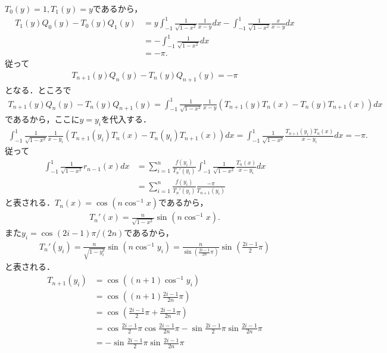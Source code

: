 \documentclass[a4j,papersize,disablejfam,slide,14pt]{jsarticle}
\def\sin#1#2{\operatorname{sin}^{#2} #1} %
\def\cos#1#2{\operatorname{cos}^{#2} #1} %
\begin{document}
    $T_0(y)=1, T_1(y)=y$であるから，
    \begin{align}
    	T_1(y)Q_0(y) - T_0(y)Q_1(y) &= y \int_{-1}^{1} \frac{1}{\sqrt{1-x^2}} \frac{1}{x-y} dx - \int_{-1}^{1} \frac{1}{\sqrt{1-x^2}} \frac{x}{x-y} dx \\
        &= - \int_{-1}^{1} \frac{1}{\sqrt{1-x^2}} dx \\
        &= -\pi.
    \end{align}
    従って
    \begin{align}
    	T_{n+1}(y)Q_n(y) - T_n(y)Q_{n+1}(y) = -\pi
    \end{align}
    となる．ところで
    \begin{align}
    	T_{n+1}(y)Q_n(y) - T_n(y)Q_{n+1}(y) = \int_{-1}^{1} \frac{1}{\sqrt{1-x^2}} \frac{1}{x-y} \left( T_{n+1}(y)T_n(x) - T_n(y)T_{n+1}(x) \right) dx
    \end{align}
    であるから，ここに$y=y_i$を代入する．
    \begin{align}
    	\int_{-1}^{1} \frac{1}{\sqrt{1-x^2}} \frac{1}{x-y_i} \left( T_{n+1}(y_i)T_n(x) - T_n(y_i)T_{n+1}(x) \right) dx
        = \int_{-1}^{1} \frac{1}{\sqrt{1-x^2}} \frac{T_{n+1}(y_i)T_n(x)}{x-y_i} dx = -\pi.
    \end{align}
    従って
    \begin{align}
    	\int_{-1}^{1} \frac{1}{\sqrt{1-x^2}} r_{n-1}(x) dx &= \sum_{i=1}^{n} \frac{f(y_i)}{T_n'(y_i)} \int_{-1}^{1} \frac{1}{\sqrt{1-x^2}} \frac{T_n(x)}{x-y_i} dx \\
        &= \sum_{i=1}^{n} \frac{f(y_i)}{T_n'(y_i)} \frac{-\pi}{T_{n+1}(y_i)}
    \end{align}
    と表される．$T_n(x) = \cos{(n\cos{x}{-1})}{}$であるから，
    \begin{align}
    	T_n'(x) = \frac{n}{\sqrt{1-x^2}} \sin{(n\cos{x}{-1})}{}.
    \end{align}
    また$y_i = \cos{(2i-1)\pi/(2n)}{}$であるから，
    \begin{align}
    	T_n'(y_i) = \frac{n}{\sqrt{1-y_i^2}} \sin{(n\cos{y_i}{-1})}{} = \frac{n}{\sin{\left( \frac{2i-1}{2n}\pi \right)}{}} \sin{\left( \frac{2i-1}{2}\pi \right)}{}
    \end{align}
    と表される．
    \begin{align}
    	T_{n+1}(y_i) &= \cos{\left( (n+1)\cos{y_i}{-1} \right)}{} \\
        &= \cos{\left( (n+1)\frac{2i-1}{2n}\pi \right)}{} \\
        &= \cos{\left( \frac{2i-1}{2}\pi +  \frac{2i-1}{2n}\pi \right)}{} \\
        &= \cos{\frac{2i-1}{2}\pi}{} \cos{\frac{2i-1}{2n}\pi}{} - \sin{\frac{2i-1}{2}\pi}{} \sin{\frac{2i-1}{2n}\pi}{} \\
        &= - \sin{\frac{2i-1}{2}\pi}{} \sin{\frac{2i-1}{2n}\pi}{}
    \end{align}
\end{document}
